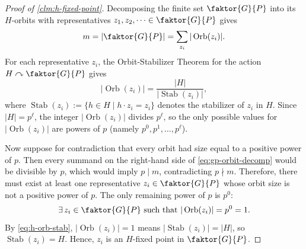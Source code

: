 \begin{proofWrapper}
\begin{content}
\begin{center}
\end{center}

\begin{proof}[Proof of \cref{clm:h-fixed-point}]
Decomposing the finite set $\faktor{G}{P}$ into its $H$-orbits with representatives $z_1, z_2, \dots \in \faktor{G}{P}$ gives
\begin{equation}\label{eq:gp-orbit-decomp}
m = \left|\faktor{G}{P}\right| = \sum_{z_i} |\operatorname{Orb}(z_i)|.
\end{equation}
For each representative $z_i$, the Orbit-Stabilizer Theorem for the action $H \curvearrowright \faktor{G}{P}$ gives
\begin{equation}\label{eq:h-orb-stab}
|\operatorname{Orb}(z_i)| = \frac{|H|}{|\operatorname{Stab}(z_i)|},
\end{equation}
where $\operatorname{Stab}(z_i) := \{ h \in H \mid h \cdot z_i = z_i \}$ denotes the stabilizer of $z_i$ in $H$. Since $|H| = p^\ell$, the integer $|\operatorname{Orb}(z_i)|$ divides $p^\ell$, so the only possible values for $|\operatorname{Orb}(z_i)|$ are powers of $p$ (namely $p^0, p^1, \dots, p^\ell$).

Now suppose for contradiction that every orbit had size equal to a positive power of $p$. Then every summand on the right-hand side of \eqref{eq:gp-orbit-decomp} would be divisible by $p$, which would imply $p \mid m$, contradicting $p \nmid m$. Therefore, there must exist at least one representative $z_i \in \faktor{G}{P}$ whose orbit size is not a positive power of $p$. The only remaining power of $p$ is $p^0$:
\begin{equation}\label{eq:fixed-point-orbit}
\exists\, z_i \in \faktor{G}{P} \text{ such that } |\operatorname{Orb}(z_i)| = p^0 = 1.
\end{equation}
By \eqref{eq:h-orb-stab}, $|\operatorname{Orb}(z_i)| = 1$ means $|\operatorname{Stab}(z_i)| = |H|$, so $\operatorname{Stab}(z_i) = H$. Hence, $z_i$ is an $H$-fixed point in $\faktor{G}{P}$.
\end{proof}


\end{content}
\end{proofWrapper}
